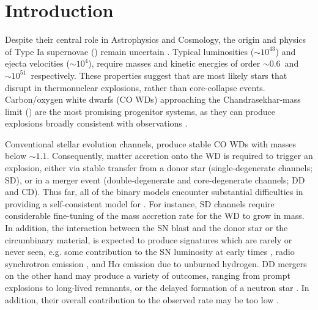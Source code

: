 \documentclass[twocolumn]{aa}
\begin{document}
\section{Introduction} \label{sec:intro}

 Despite their central role in Astrophysics and Cosmology, 
 the origin and physics of Type Ia supernovae (\ias)
remain uncertain  \citep[][]{Maoz:2013hna}. 
Typical \ia  luminosities ($\sim 10^{43}$\ergs) and ejecta velocities  
($ \sim 10^{4}$\kms), require   
masses and kinetic energies of order 
$\sim 0.6$\msun\ and $\sim 10^{51}$\erg\ respectively. 
 These properties suggest that \ias are most likely 
 stars that disrupt in  thermonuclear explosions, 
 rather than core-collapse events. 
 Carbon/oxygen white dwarfs (CO WDs) 
 approaching the Chandrasekhar-mass limit (\mch)
 are the most promising progenitor systems, as they can
 produce explosions broadly consistent with observations
 \citep{Nomoto:1982zz,Wang:2012za,Churazov:2014bga}. 
 
Conventional stellar evolution channels, produce stable CO WDs with masses below $\sim 1.1$\msun. 
Consequently, matter accretion onto the WD is required to trigger an 
explosion, either via stable  transfer from a 
donor star (single-degenerate channels; SD), or in a 
 merger event (double-degenerate  and core-degenerate channels; DD and CD).  
Thus far, all of the  binary models    
encounter substantial difficulties in providing 
a self-consistent model for \ias \citep{Livio:2018rue,soker2019}. 
For instance, SD channels require considerable fine-tuning
of the mass accretion rate for
the WD to grow in mass. In addition, the interaction between  
the SN blast and the donor star or the circumbinary material, is expected to produce  signatures which 
are rarely or never seen, e.g. some contribution to the SN  luminosity 
at early times \citep{Kasen:2009si}, radio synchrotron emission 
\citep{Harris:2016hfr}, and H$\alpha$ emission due to unburned hydrogen. 
DD mergers on the other hand may produce a variety of outcomes, 
ranging from prompt 
explosions to long-lived remnants, or the delayed formation of a neutron star \citep{Livio:2018rue}. 
In addition, their overall contribution to the observed \ia rate may be too low \citep{vanKerkwijk:2010he,claeys2014a,Sato:2015spa}. %
\end{document}
